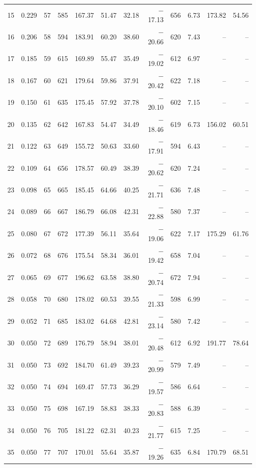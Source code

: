 \begin{table}[H]
\begin{tabular}{rrrrrrrrrrrr}
15 & 0.229 & 57 & 585 & 167.37 & 51.47 & 32.18 & $-$17.13 & 656 & 6.73 & 173.82 & 54.56 \\
16 & 0.206 & 58 & 594 & 183.91 & 60.20 & 38.60 & $-$20.66 & 620 & 7.43 & -- & -- \\
17 & 0.185 & 59 & 615 & 169.89 & 55.47 & 35.49 & $-$19.02 & 612 & 6.97 & -- & -- \\
18 & 0.167 & 60 & 621 & 179.64 & 59.86 & 37.91 & $-$20.42 & 622 & 7.18 & -- & -- \\
19 & 0.150 & 61 & 635 & 175.45 & 57.92 & 37.78 & $-$20.10 & 602 & 7.15 & -- & -- \\
20 & 0.135 & 62 & 642 & 167.83 & 54.47 & 34.49 & $-$18.46 & 619 & 6.73 & 156.02 & 60.51 \\
21 & 0.122 & 63 & 649 & 155.72 & 50.63 & 33.60 & $-$17.91 & 594 & 6.43 & -- & -- \\
22 & 0.109 & 64 & 656 & 178.57 & 60.49 & 38.39 & $-$20.62 & 620 & 7.24 & -- & -- \\
23 & 0.098 & 65 & 665 & 185.45 & 64.66 & 40.25 & $-$21.71 & 636 & 7.48 & -- & -- \\
24 & 0.089 & 66 & 667 & 186.79 & 66.08 & 42.31 & $-$22.88 & 580 & 7.37 & -- & -- \\
25 & 0.080 & 67 & 672 & 177.39 & 56.11 & 35.64 & $-$19.06 & 622 & 7.17 & 175.29 & 61.76 \\
26 & 0.072 & 68 & 676 & 175.54 & 58.34 & 36.01 & $-$19.42 & 658 & 7.04 & -- & -- \\
27 & 0.065 & 69 & 677 & 196.62 & 63.58 & 38.80 & $-$20.74 & 672 & 7.94 & -- & -- \\
28 & 0.058 & 70 & 680 & 178.02 & 60.53 & 39.55 & $-$21.33 & 598 & 6.99 & -- & -- \\
29 & 0.052 & 71 & 685 & 183.02 & 64.68 & 42.81 & $-$23.14 & 580 & 7.42 & -- & -- \\
30 & 0.050 & 72 & 689 & 176.79 & 58.94 & 38.01 & $-$20.48 & 612 & 6.92 & 191.77 & 78.64 \\
31 & 0.050 & 73 & 692 & 184.70 & 61.49 & 39.23 & $-$20.99 & 579 & 7.49 & -- & -- \\
32 & 0.050 & 74 & 694 & 169.47 & 57.73 & 36.29 & $-$19.57 & 586 & 6.64 & -- & -- \\
33 & 0.050 & 75 & 698 & 167.19 & 58.83 & 38.33 & $-$20.83 & 588 & 6.39 & -- & -- \\
34 & 0.050 & 76 & 705 & 181.22 & 62.31 & 40.23 & $-$21.77 & 615 & 7.25 & -- & -- \\
35 & 0.050 & 77 & 707 & 170.01 & 55.64 & 35.87 & $-$19.26 & 635 & 6.84 & 170.79 & 68.51 \\

\end{tabular}
\end{table}
